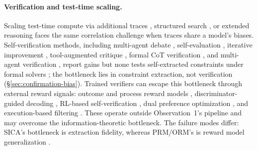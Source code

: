 \paragraph{Verification and test-time scaling.}
Scaling test-time compute via additional traces \citep{snell2025scaling}, structured search \citep{yao2023tree}, or extended reasoning \citep{guo2025deepseekr1, qwen2024qwq} faces the same correlation challenge when traces share a model's biases. Self-verification methods, including multi-agent debate \citep{liang2023encouraging, du2023improving}, self-evaluation \citep{xie2023selfevaluation, weng2023selfverification, madaan2023selfrefine, dhuliawala2023chainofverification}, iterative improvement \citep{shinn2023reflexion, zhou2023lats}, tool-augmented critique \citep{gou2024critic}, formal CoT verification \citep{feng2025vericot, chen2025sets}, and multi-agent verification \citep{lifshitz2025mav}, report gains but none tests self-extracted constraints under formal solvers \citep[cf.][]{kamoi2024selfcorrect}; the bottleneck lies in constraint extraction, not verification (\S\ref{sec:confirmation-bias}). Trained verifiers can escape this bottleneck through external reward signals: outcome and process reward models \citep{cobbe2021gsm8k, lightman2024prm, wang2024mathshepherd}, discriminator-guided decoding \citep{khalifa2023grace}, RL-based self-verification \citep{zeng2025s2r}, dual preference optimization \citep{dupo2025}, and execution-based filtering \citep{li2022alphacode, chen2023codet}. These operate outside Observation~1's pipeline and may overcome the information-theoretic bottleneck. The failure modes differ: SICA's bottleneck is extraction fidelity, whereas PRM/ORM's is reward model generalization \citep{wang2024mathshepherd}.
